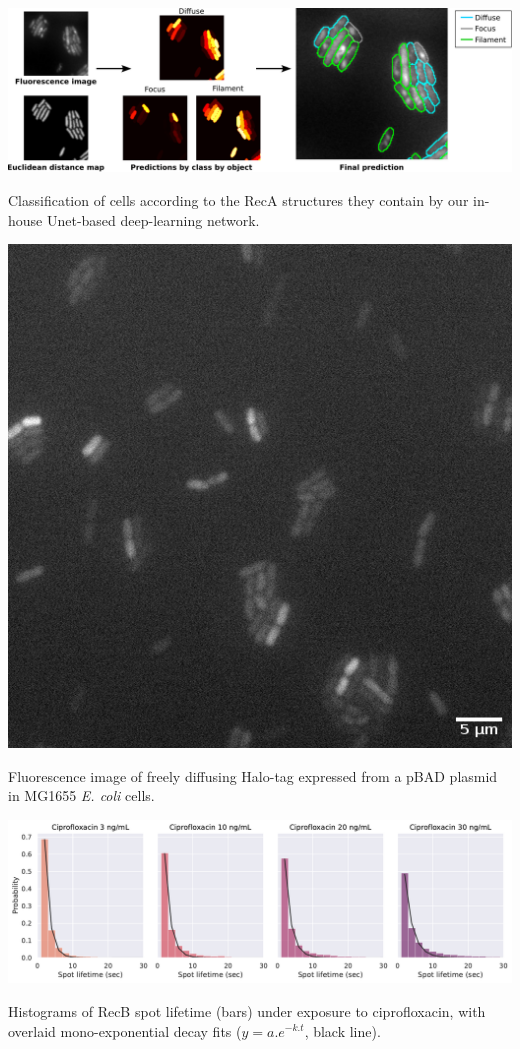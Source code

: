 \begin{suppfigure*}[htbp]
    \begin{center}
    \includegraphics[width=\textwidth]{SI_Figures/ObjectClassifier.pdf}
    \end{center}
    \caption{Classification of cells according to the RecA structures they contain by our in-house Unet-based deep-learning network.}
    \label{SIFig:object_class}
\end{suppfigure*}

\begin{suppfigure*}[htbp]
\begin{center}
\includegraphics[width=.5\linewidth]{SI_Figures/Free_Halo_image.png}
\end{center}
\caption{Fluorescence image of freely diffusing Halo-tag expressed from a pBAD plasmid in MG1655 \textit{E. coli} cells.}
\label{SIFig:freehalo_image}
\end{suppfigure*}

\begin{suppfigure*}[htbp]
\begin{center}
\includegraphics[width=\linewidth]{SI_Figures/Monoexp_fits_cipro.pdf}
\end{center}
\caption{Histograms of RecB spot lifetime (bars) under exposure to ciprofloxacin, with overlaid mono-exponential decay fits ($y=a.e^{-k.t}$, black line).}
\label{SIFig:monoexp_fits}
\end{suppfigure*}

